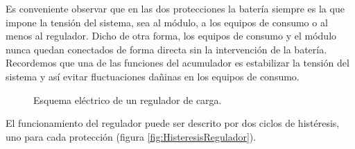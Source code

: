 Es conveniente observar que en las dos protecciones la batería siempre
es la que impone la tensión del sistema, sea al módulo, a los equipos
de consumo o al menos al regulador. Dicho de otra forma, los equipos
de consumo y el módulo nunca quedan conectados de forma directa sin
la intervención de la batería. Recordemos que una de las funciones
del acumulador es estabilizar la tensión del sistema y así evitar
fluctuaciones dañinas en los equipos de consumo.

%
\begin{figure}
\hfill{}\hfill{}\hfill{}

\caption{Esquema eléctrico de un regulador de carga.}



\end{figure}


El funcionamiento del regulador puede ser descrito por dos ciclos
de histéresis, uno para cada protección (figura \ref{fig:HisteresisRegulador}). 

